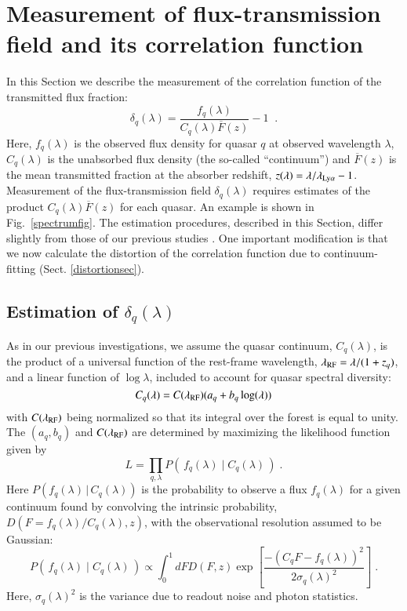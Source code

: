 \documentclass{aa}
\newcommand{\lamrf}{\lambda_{\rm RF}}
\newcommand{\lamlya}{\lambda_{\rm Ly\alpha}}
\newcommand{\fqlam}{f_q(\lambda)}
\newcommand{\dqlam}{\delta_q(\lambda)}
\begin{document}
\section{Measurement of flux-transmission field and its correlation function}
\label{xisec}



In this Section we describe the measurement of the
correlation function of the transmitted flux fraction:
\begin{equation}
\dqlam=\frac{\fqlam}{ C_q(\lambda)\overline{F}(z)}-1 
\;\; .
\label{delta:def}
\end{equation}
Here, $\fqlam$ is the observed flux density for quasar $q$
at observed wavelength $\lambda$,
$C_q(\lambda)$ is the unabsorbed flux density 
(the so-called ``continuum'') and
 $\overline{F}(z)$ is the mean transmitted fraction
 at the absorber redshift, $z(\lambda)=\lambda/\lamlya-1$. 
Measurement of the flux-transmission field $\dqlam$ requires estimates
of the product $C_q(\lambda)\overline{F}(z)$ for each quasar.
An example is shown in Fig.~\ref{spectrumfig}.
The estimation procedures, 
described in this Section, differ slightly from 
those of our previous studies \citep{2013A&A...552A..96B,2015A&A...574A..59D}.
One important modification is that
we now calculate the distortion of the correlation
function due to continuum-fitting
(Sect. \ref{distortionsec}).

\subsection{Estimation of $\dqlam$}
\label{deltaestimationsec}

As in our previous investigations,
we assume the quasar continuum, $C_q(\lambda)$, 
is the product of  a universal
function of the rest-frame wavelength, $\lamrf=\lambda/(1+z_q)$, and
a linear function of $\log\lambda$, included to account for 
quasar spectral diversity:
\begin{equation}
C_q(\lambda) 
= C(\lamrf)
(a_q + b_q\log(\lambda))
\label{templatewarpeq}
\end{equation}
with $C(\lamrf)$ being normalized so that its integral over the forest
is equal to unity.
The $(a_q,b_q)$ and $C(\lamrf)$ are determined by maximizing
the likelihood function given by
\begin{equation}
L = \prod_{q,\lambda} P(\, \fqlam\;|\;C_q(\lambda)\,) \;.
\end{equation} 
Here $P(\fqlam\, | \,C_q(\lambda))$ is the 
probability to observe a flux $\fqlam$
for a given continuum found by convolving the intrinsic probability,
$D(F=\fqlam/C_q(\lambda),z)$,
with the observational resolution assumed to be Gaussian: 
\begin{equation}
 P(\, \fqlam\;|\;C_q(\lambda)\,)
\propto
\int_0^1 dF D(F,z)\exp\left[
\frac{-(C_qF-\fqlam)^2}{2\sigma_q(\lambda)^2}
\right]\;.
\end{equation}
Here, $\sigma_q(\lambda)^2$ is the variance due to readout noise and
photon statistics.
\end{document}
